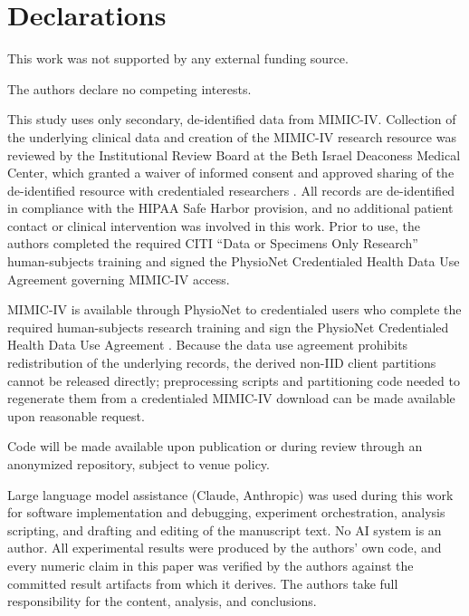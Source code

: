 \documentclass[pdflatex,sn-mathphys-num]{sn-jnl}
\begin{document}
\backmatter

\section*{Declarations}

 This work was not supported by any external funding source.

 The authors declare no competing interests.

 This study uses only secondary, de-identified data from MIMIC-IV. Collection of the underlying clinical data and creation of the MIMIC-IV research resource was reviewed by the Institutional Review Board at the Beth Israel Deaconess Medical Center, which granted a waiver of informed consent and approved sharing of the de-identified resource with credentialed researchers \cite{johnson2023mimic}. All records are de-identified in compliance with the HIPAA Safe Harbor provision, and no additional patient contact or clinical intervention was involved in this work. Prior to use, the authors completed the required CITI ``Data or Specimens Only Research'' human-subjects training and signed the PhysioNet Credentialed Health Data Use Agreement governing MIMIC-IV access.

 MIMIC-IV is available through PhysioNet to credentialed users who complete the required human-subjects research training and sign the PhysioNet Credentialed Health Data Use Agreement \cite{johnson2023mimic}. Because the data use agreement prohibits redistribution of the underlying records, the derived non-IID client partitions cannot be released directly; preprocessing scripts and partitioning code needed to regenerate them from a credentialed MIMIC-IV download can be made available upon reasonable request.

 Code will be made available upon publication or during review through an anonymized repository, subject to venue policy.

 Large language model assistance (Claude, Anthropic) was used during this work for software implementation and debugging, experiment orchestration, analysis scripting, and drafting and editing of the manuscript text. No AI system is an author. All experimental results were produced by the authors' own code, and every numeric claim in this paper was verified by the authors against the committed result artifacts from which it derives. The authors take full responsibility for the content, analysis, and conclusions.
\end{document}
